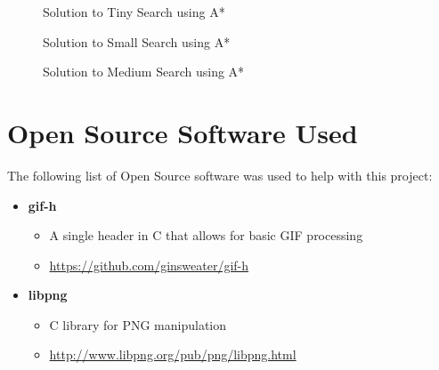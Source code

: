 \documentclass{article}[12pt]
\begin{document}
\begin{appendices}
   \begin{figure}[!htb]
   \centering
   \caption{Solution to Tiny Search using A*}
   \label{fig:astar_ts_chull}
   \end{figure}
   
   \begin{figure}[!htb]
   \centering
   \caption{Solution to Small Search using A*}
   \label{fig:astar_ss_chull}
   \end{figure}
   
   \begin{figure}[!htb]
   \centering
   \caption{Solution to Medium Search using A*}
   \label{fig:astar_ms_chull}
   \end{figure}
   
   \section{Open Source Software Used}
   The following list of Open Source software was used to help with this project:
   
   \begin{itemize}
   \item \textbf{gif-h}
   		\begin{itemize}
   		\item A single header in C that allows for basic GIF processing
   		\item \href{https://github.com/ginsweater/gif-h}{https://github.com/ginsweater/gif-h}
   		\end{itemize}
   \item \textbf{libpng}
   		\begin{itemize}
   		\item C library for PNG manipulation
   		\item \href{http://www.libpng.org/pub/png/libpng.html}{http://www.libpng.org/pub/png/libpng.html}
   		\end{itemize}
   \end{itemize}

\end{appendices}   
   
   
   
\end{document}
